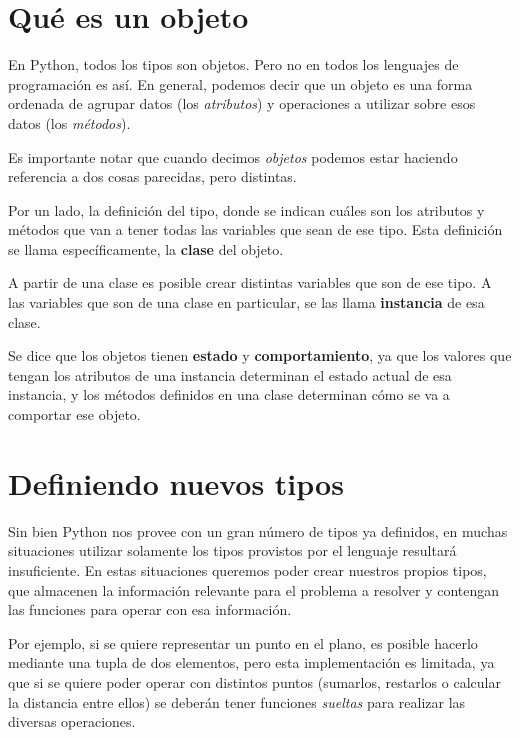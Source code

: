 \section{Qué es un objeto}

En Python, todos los tipos son objetos.  Pero no en todos los lenguajes de
programación es así.  En general, podemos decir que un objeto es una forma
ordenada de agrupar datos (los {\it atributos}) y operaciones a utilizar
sobre esos datos (los {\it métodos}).

Es importante notar que cuando decimos {\it objetos} podemos estar haciendo
referencia a dos cosas parecidas, pero distintas.

Por un lado, la definición del tipo, donde se indican cuáles son los
atributos y métodos que van a tener todas las variables que sean de ese
tipo.  Esta definición se llama específicamente, la {\bf clase} del objeto.

A partir de una clase es posible crear distintas variables que son de ese
tipo. A las variables que son de una clase en particular, se las llama
{\bf instancia} de esa clase.

\begin{observacion}
Se dice que los objetos tienen {\bf estado} y {\bf comportamiento}, ya que
los valores que tengan los atributos de una instancia determinan el estado
actual de esa instancia, y los métodos definidos en una clase determinan
cómo se va a comportar ese objeto.
\end{observacion}


\section{Definiendo nuevos tipos}

Sin bien Python nos provee con un gran número de tipos ya definidos, en
muchas situaciones utilizar solamente los tipos provistos por el lenguaje
resultará insuficiente.  En estas situaciones queremos poder crear nuestros
propios tipos, que almacenen la información relevante para el problema a
resolver y contengan las funciones para operar con esa información.

Por ejemplo, si se quiere representar un punto en el plano, es posible
hacerlo mediante una tupla de dos elementos, pero esta implementación es
limitada, ya que si se quiere poder operar con distintos puntos (sumarlos,
restarlos o calcular la distancia entre ellos) se deberán tener funciones
{\it sueltas} para realizar las diversas operaciones.

